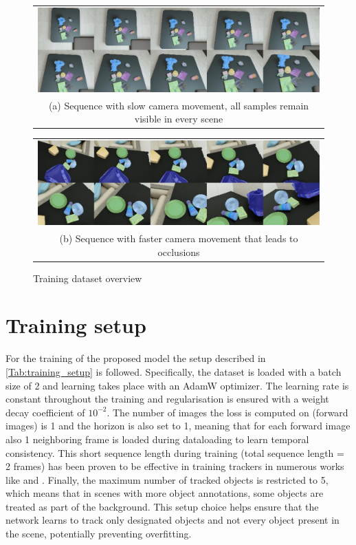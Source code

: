 \begin{figure}[h!]
  \centering
  \begin{tabular}{@{}c@{}}
     \includegraphics[width=1.\linewidth]{figures/03_method/easy_sequence.pdf}\\[\abovecaptionskip]
    \small (a) Sequence with slow camera movement, all samples remain visible in every scene
  \end{tabular}

  \vspace{0.5cm}

  \begin{tabular}{@{}c@{}}
    \includegraphics[width=1.\linewidth]{figures/03_method/hard_sequence.pdf}\\[\abovecaptionskip]
    \small (b) Sequence with faster camera movement that leads to occlusions
  \end{tabular}
    
  \caption{Training dataset overview 
  }\label{fig:dataset_overview}
\end{figure}


\section{Training setup}
For the training of the proposed model the setup described in \tabref\ref{Tab:training_setup} is followed.
Specifically, the dataset is loaded with a batch size of 2 and learning takes place with an AdamW optimizer. The learning rate is constant throughout the training and regularisation is ensured with a weight decay coefficient of $10^{-2}$. The number of images the loss is computed on (forward images) is 1 and the horizon is also set to 1, meaning that for each forward image also 1 neighboring frame is loaded during dataloading to learn temporal consistency. This short sequence length during training (total sequence length = 2 frames) has been proven to be effective in training trackers in numerous works like \parencite{meinhardt2021trackformer} and \parencite{savi}. Finally, the maximum number of tracked objects is restricted to 5, which means that in scenes with more object annotations, some objects are treated as part of the background. This setup choice helps ensure that the network learns to track only designated objects and not every object present in the scene, potentially preventing overfitting. \par

